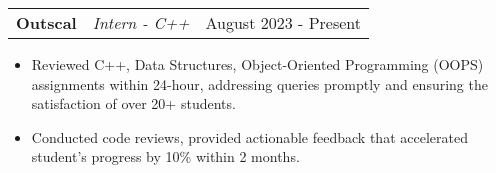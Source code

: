 \documentclass[a4paper,10pt]{article}
\makeatletter
\newenvironment{joblong}[3]
    {
    \begin{tabularx}{\linewidth}{@{}l X r@{}}
    \textbf{#1} & \textit{#2} &  #3 \\[3pt]
    \end{tabularx}
    \begin{minipage}[t]{\linewidth}
    \begin{itemize}[nosep,after=\strut, leftmargin=1em, itemsep=2pt,label=--]
    }
    {
    \end{itemize}
    \end{minipage}    
    }
\makeatother
\begin{document}
\begin{joblong}{Outscal}{Intern - C++}{August 2023 - Present}
    \item Reviewed C++, Data Structures, Object-Oriented Programming (OOPS) assignments within 24-hour, addressing
    queries promptly and ensuring the satisfaction of over 20+ students.
    \item Conducted code reviews, provided actionable feedback that accelerated student’s progress by 10\% within 2 months.
\end{joblong}
\end{document}
